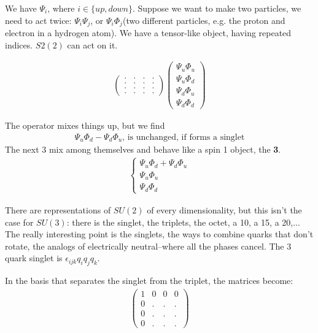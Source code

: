 \documentclass[]{article}
\begin{document}
We have $\Psi_i$, where $i\in \{up,down\}$. Suppose we want to make two particles, we need to act twice: $\Psi_i\Psi_j$, or $\Psi_i\Phi_j$(two different particles, e.g. the proton and electron in a hydrogen atom). We have a tensor-like object, having repeated indices. $S2(2)$ can act on it.

\begin{align*}
	\begin{pmatrix}
		.&.&.&.\\
		.&.&.&.\\
		.&.&.&.\\
		.&.&.&.
	\end{pmatrix} \begin{pmatrix}
						\Psi_u\Phi_u\\
						\Psi_u\Phi_d\\
						\Psi_d\Phi_u\\
						\Psi_d\Phi_d
				\end{pmatrix} 
\end{align*}

 The operator mixes things up, but we find
\begin{align*}
    \Psi_u\Phi_d-\Psi_d\Phi_u \text{, is unchanged, if forms a singlet}	
\end{align*}
The next 3 mix among themselves and behave like a spin 1 object, the {\bfseries 3}.
\begin{align*}
	\begin{cases}
		\Psi_u\Phi_d+\Psi_d\Phi_u\\
		\Psi_u\Phi_u\\
		\Psi_d\Phi_d
	\end{cases}
\end{align*}

There are representations of $SU(2)$ of every dimensionality, but this isn't the case for $SU(3)$: there is the singlet, the triplets, the octet, a 10, a 15, a 20,... The really interesting point is the singlets, the ways to combine quarks that don't rotate, the analogs of electrically neutral--where all the phases cancel. The 3 quark singlet is $\epsilon_{ijk}q_{i}q_{j}q_{k}$. 

In the  basis that separates the singlet from the triplet, the matrices become:
\begin{align*}
	\begin{pmatrix}
		1&0&0&0\\
		0&.&.&.\\
		0&.&.&.\\
		0&.&.&.
	\end{pmatrix}
\end{align*}
\end{document}
